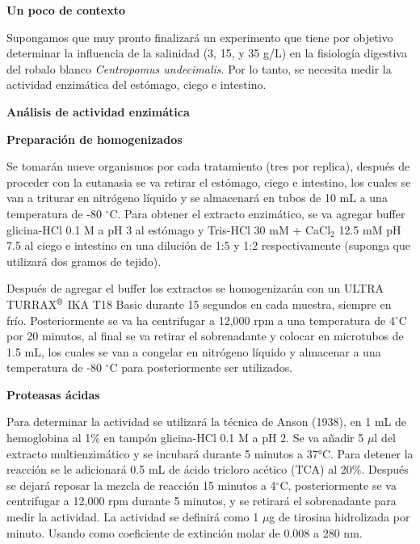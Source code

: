 \documentclass[12pt,a4paper]{article}
\newcommand{\sect}[1]{
	\begin{tcolorbox}[colframe= white,top=2pt, bottom=2pt, colback = gris]
	 \textbf{#1} %
    \end{tcolorbox}
 }
\begin{document}
\begin{multicols}{2}

    \raggedcolumns
    
\sect{Un poco de contexto}

Supongamos que muy pronto finalizar\'a un experimento que tiene por objetivo determinar la influencia de la salinidad (3, 15, y 35 g/L) en la fisiolog\'ia digestiva del robalo blanco \textit{Centropomus undecimalis}. Por lo tanto, se necesita medir la actividad enzim\'atica del est\'omago, ciego e intestino. 

\sect{An\'alisis de actividad enzim\'atica}

\begin{Exercice}\textbf{ Preparaci\'on de homogenizados}

	Se tomar\'an nueve organismos por cada tratamiento (tres por replica), después de proceder con la eutanasia se va retirar el est\'omago, ciego e intestino, los cuales se van a triturar en nitr\'ogeno l\'iquido y se almacenar\'a en tubos de 10 mL a una temperatura de -80 $^\circ$C. Para obtener el extracto enzim\'atico, se va agregar buffer glicina-HCl 0.1 M a pH 3 al estómago y Tris-HCl 30 mM + CaCl$_2$ 12.5 mM pH 7.5 al ciego e intestino en una dilución de 1:5 y 1:2 respectivamente (suponga que utilizar\'a dos gramos de tejido).
	
	Despu\'es de agregar el buffer los extractos se homogenizar\'an con un ULTRA TURRAX$^{\mbox{\scriptsize\textregistered}}$  IKA T18 Basic durante 15 segundos en cada muestra, siempre en frío. Posteriormente se va ha centrifugar a 12,000 rpm a una temperatura de 4$^\circ$C por 20 minutos, al final se va retirar el sobrenadante y colocar en microtubos de 1.5 mL, los cuales se van a congelar en nitrógeno líquido y almacenar a una temperatura de -80 $^\circ$C para posteriormente ser utilizados. 
	
\end{Exercice}
    
\begin{Exercice} \textbf{Proteasas ácidas}
	
	Para determinar la actividad se utilizar\'a la técnica de Anson (1938), en 1 mL de hemoglobina al 1\% en tampón glicina-HCl 0.1 M a pH 2. Se va a\~nadir 5 $\mu$l del extracto multienzimático y se incubar\'a durante 5 minutos a 37°C. Para detener la reacción se le adicionar\'a 0.5 mL de ácido tricloro acético (TCA) al 20\%. Después se dejar\'a reposar la mezcla de reacción 15 minutos a 4$^\circ$C, posteriormente se va centrifugar a 12,000 rpm durante 5 minutos, y se retirar\'a el sobrenadante para medir la actividad. La actividad se definir\'a como 1 $\mu$g de tirosina hidrolizada por minuto. Usando como coeficiente de extinción molar de 0.008 a 280 nm.


\end{Exercice}
\end{multicols}
\end{document}
